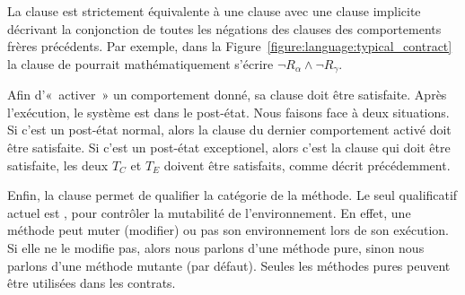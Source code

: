 La clause \adefault est strictement équivalente à une clause \abehavior avec une
clause \arequires implicite décrivant la conjonction de toutes les négations des
clauses \arequires des comportements frères précédents.  Par exemple, dans la
Figure~\ref{figure:language:typical_contract} la clause \arequires de \adefault
pourrait mathématiquement s'écrire $\neg R_\alpha \land \neg R_\gamma$.

Afin d'«~activer~» un comportement donné, sa clause \arequires doit être
satisfaite. Après l'exécution, le système est dans le post-état. Nous faisons
face à deux situations. Si c'est un post-état normal, alors la clause \aensures
du dernier comportement activé doit être satisfaite. Si c'est un post-état
exceptionel, alors c'est la clause \athrowable qui doit être satisfaite, \ie les
deux $T_C$ et $T_E$ doivent être satisfaits, comme décrit précédemment.

Enfin, la clause \ais permet de qualifier la catégorie de la méthode. Le seul
qualificatif actuel est , pour contrôler la mutabilité de
l'environnement. En effet, une méthode peut muter (modifier) ou pas son
environnement lors de son exécution. Si elle ne le modifie pas, alors nous
parlons d'une méthode {\strong pure}, sinon nous parlons d'une méthode {\strong
mutante} (par défaut). Seules les méthodes pures peuvent être utilisées dans les
contrats.

